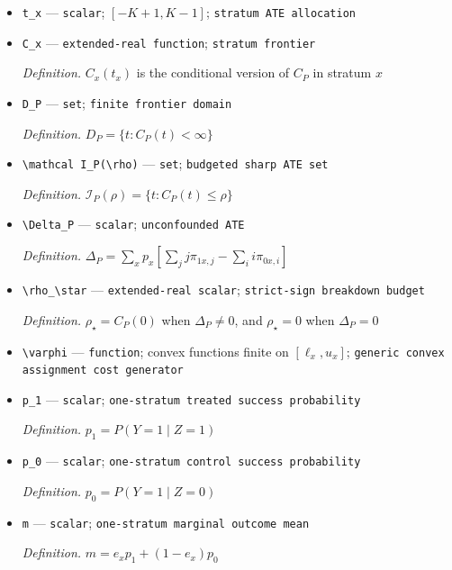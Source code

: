 \documentclass{article}
\begin{document}
\begin{itemize}
  \item \texttt{t\_\allowbreak{}x} --- \texttt{scalar}; \([-K+1,K-1]\); \texttt{stratum ATE allocation}
  \item \texttt{C\_\allowbreak{}x} --- \texttt{extended-\allowbreak{}real function}; \texttt{stratum frontier}
  \par\smallskip\noindent\emph{Definition.} \(C_x(t_x)\) is the conditional version of \(C_P\) in stratum \(x\)
  \item \texttt{D\_\allowbreak{}P} --- \texttt{set}; \texttt{finite frontier domain}
  \par\smallskip\noindent\emph{Definition.} \(D_P=\{t:C_P(t)<\infty\}\)
  \item \texttt{\textbackslash{}\allowbreak{}mathcal I\_\allowbreak{}P(\textbackslash{}\allowbreak{}rho)} --- \texttt{set}; \texttt{budgeted sharp ATE set}
  \par\smallskip\noindent\emph{Definition.} \(\mathcal I_P(\rho)=\{t:C_P(t)\leq\rho\}\)
  \item \texttt{\textbackslash{}\allowbreak{}Delta\_\allowbreak{}P} --- \texttt{scalar}; \texttt{unconfounded ATE}
  \par\smallskip\noindent\emph{Definition.} \(\Delta_P=\sum_xp_x[\sum_jj\pi_{1x,j}-\sum_ii\pi_{0x,i}]\)
  \item \texttt{\textbackslash{}\allowbreak{}rho\_\allowbreak{}\textbackslash{}\allowbreak{}star} --- \texttt{extended-\allowbreak{}real scalar}; \texttt{strict-\allowbreak{}sign breakdown budget}
  \par\smallskip\noindent\emph{Definition.} \(\rho_\star=C_P(0)\) when \(\Delta_P\neq0\), and \(\rho_\star=0\) when \(\Delta_P=0\)
  \item \texttt{\textbackslash{}\allowbreak{}varphi} --- \texttt{function}; convex functions finite on \([\ell_x,u_x]\); \texttt{generic convex assignment cost generator}
  \item \texttt{p\_\allowbreak{}1} --- \texttt{scalar}; \texttt{one-\allowbreak{}stratum treated success probability}
  \par\smallskip\noindent\emph{Definition.} \(p_1=P(Y=1\mid Z=1)\)
  \item \texttt{p\_\allowbreak{}0} --- \texttt{scalar}; \texttt{one-\allowbreak{}stratum control success probability}
  \par\smallskip\noindent\emph{Definition.} \(p_0=P(Y=1\mid Z=0)\)
  \item \texttt{m} --- \texttt{scalar}; \texttt{one-\allowbreak{}stratum marginal outcome mean}
  \par\smallskip\noindent\emph{Definition.} \(m=e_xp_1+(1-e_x)p_0\)

\end{itemize}
\end{document}
